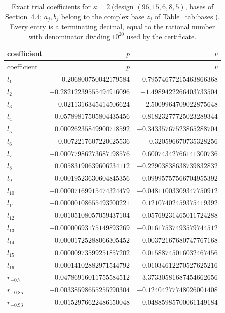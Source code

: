 \documentclass[11pt]{article}
\theoremstyle{definition}
\begin{document}
{\small
\begin{longtable}{lrr}
\caption{Exact trial coefficients for $\kappa=2$ (design $(96,15,6,8,5)$, bases of Section~4.4; $a_j,b_j$ belong to the complex base $z_j$ of Table~\ref{tab:bases}). Every entry is a terminating decimal, equal to the rational number with denominator dividing $10^{20}$ used by the certificate.}\label{tab:coef2}\\
\toprule coefficient & $p$ & $v$\\\midrule\endfirsthead
\toprule coefficient & $p$ & $v$\\\midrule\endhead
$l_{1}$ & $0.206800750042179584$ & $-0.79574677215463866368$\\
$l_{2}$ & $-0.28212239555494916096$ & $-1.4989422266403733504$\\
$l_{3}$ & $-0.0211316345414506624$ & $2.5009964709022875648$\\
$l_{4}$ & $0.05789817505804435456$ & $-0.81823277725023289344$\\
$l_{5}$ & $0.00026235849900718592$ & $-0.34335767523865288704$\\
$l_{6}$ & $-0.0072217607220025536$ & $-0.320596670735328256$\\
$l_{7}$ & $-0.00077986273687198576$ & $0.60074342766141300736$\\
$l_{8}$ & $0.00583190639606234112$ & $-0.22903838638739832832$\\
$l_{9}$ & $-0.00019523630604845356$ & $-0.09995757566704955392$\\
$l_{10}$ & $-0.00007169915474324479$ & $-0.04811003309347750912$\\
$l_{11}$ & $-0.00000108655493200221$ & $0.12107402459375419392$\\
$l_{12}$ & $0.00105108057059437104$ & $-0.05769231465011724288$\\
$l_{13}$ & $-0.00000693175149893269$ & $-0.01617537493579744512$\\
$l_{14}$ & $0.00001725288066305452$ & $-0.00372167680747767168$\\
$l_{15}$ & $0.00000973599251857202$ & $0.01588745016032467456$\\
$l_{16}$ & $0.00014102882971544792$ & $-0.01034612270527625216$\\
$r_{-0.7}$ & $-0.04786916011755584512$ & $3.37330581687454662656$\\
$r_{-0.85}$ & $-0.00338598655255290304$ & $-0.12404277748026001408$\\
$r_{-0.93}$ & $-0.00152976622486150048$ & $0.04885985700061149184$\\

\end{longtable}}
\end{document}
